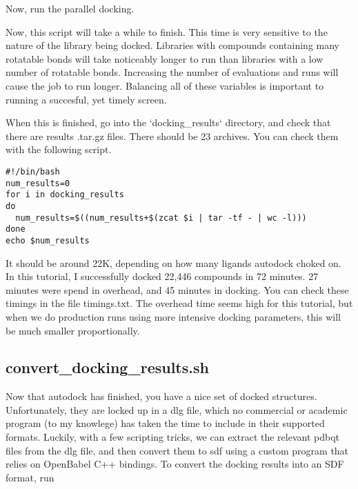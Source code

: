 Now, run the parallel docking.

\begin{quote}
\end{quote}

Now, this script will take a while to finish. This time is very sensitive to the nature of the library being docked. Libraries with compounds containing many rotatable bonds will take noticeably longer to run than libraries with a low number of rotatable bonds. Increasing the number of evaluations and runs will cause the job to run longer. Balancing all of these variables is important to running a succesful, yet timely screen. 

When this is finished, go into the `docking\_results` directory, and check that there are results .tar.gz files. There should be 23 archives. You can check them with the following script.

\begin{lstlisting}
#!/bin/bash
num_results=0
for i in docking_results
do
  num_results=$((num_results+$(zcat $i | tar -tf - | wc -l)))
done
echo $num_results

\end{lstlisting}

It should be around 22K, depending on how many ligands autodock choked on. In this tutorial, I successfully docked 22,446 compounds in 72 minutes. 27 minutes were spend in overhead, and 45 minutes in docking. You can check these timings in the file timings.txt. The overhead time seems high for this tutorial, but when we do production runs using more intensive docking parameters, this will be much smaller proportionally. 

\subsection{convert\_docking\_results.sh}

Now that autodock has finished, you have a nice set of docked structures. Unfortunately, they are locked up in a dlg file, which no commercial or academic program (to my knowlege) has taken the time to include in their supported formats. Luckily, with a few scripting tricks, we can extract the relevant pdbqt files from the dlg file, and then convert them to sdf using a custom program that relies on OpenBabel C++ bindings. To convert the docking results into an SDF format, run

\begin{quote}
\end{quote}

